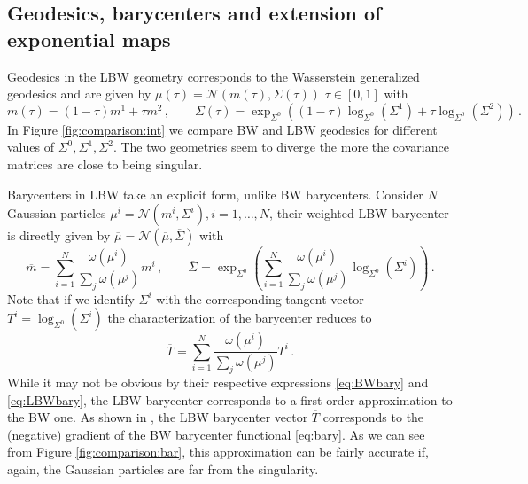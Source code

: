 \documentclass{article}
\theoremstyle{plain}
\theoremstyle{definition}
\theoremstyle{remark}
\begin{document}
\subsection{Geodesics, barycenters and extension of exponential maps}

Geodesics in the LBW geometry corresponds to the Wasserstein generalized geodesics \cite{ags2008} and are given by $\mu(\tau) = \mathcal{N}(m(\tau), \Sigma(\tau))$ $\tau \in [0,1]$ with
\begin{equation*}
m(\tau) = (1-\tau)m^1 +\tau m^2\,, \qquad
\Sigma(\tau) = \exp_{\Sigma^0}\left((1-\tau)\log_{\Sigma^0}(\Sigma^1) + \tau \log_{\Sigma^0}(\Sigma^2) \right)\,.
\end{equation*}
In Figure \ref{fig:comparison:int} we compare BW and LBW geodesics for different values of $\Sigma^0, \Sigma^1, \Sigma^2$. The two geometries seem to diverge the more the covariance matrices are close to being singular.


Barycenters in LBW take an explicit form, unlike BW barycenters. Consider $N$ Gaussian particles $\mu^i = \mathcal{N}(m^i, \Sigma^i), i = 1, \dots, N$, their weighted LBW barycenter is directly given by $\overline{\mu} = \mathcal{N}(\overline{\mu}, \overline{\Sigma})$ with 
\begin{equation} \label{eq:LBWbary}
\overline{m} = \sum_{i = 1}^N \frac{\omega(\mu^i)}{\sum_j \omega(\mu^j)} m^i \,, \qquad \overline{\Sigma} = \exp_{\Sigma^0}\left( \sum_{i=1}^N \frac{\omega(\mu^i)}{\sum_j \omega(\mu^j)} \log_{\Sigma^0}(\Sigma^i)  \right)\,.
\end{equation}
Note that if we identify $\Sigma^i$ with the corresponding tangent vector $T^i = \log_{\Sigma^0}(\Sigma^i)$ the characterization of the barycenter reduces to   
\begin{equation} \label{eq:Tbary}
\overline{T} = \sum_{i = 1}^N \frac{\omega(\mu^i)}{\sum_j \omega(\mu^j)} T^i\,.
\end{equation}
While it may not be obvious by their respective expressions  \eqref{eq:BWbary} and  \eqref{eq:LBWbary}, the LBW barycenter corresponds to a first order approximation to the BW one. As shown in \cite{zemel2019frechet}, the LBW barycenter vector $\overline{T}$  \label{eq:Tbary} corresponds to the (negative) gradient of the BW barycenter functional \eqref{eq:bary}. As we can see from Figure \ref{fig:comparison:bar}, this approximation can be fairly accurate if, again, the Gaussian particles are far from the singularity.
\end{document}
